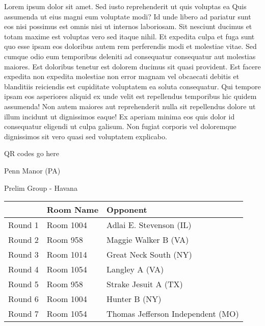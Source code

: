 \documentclass{article}%
\begin{document}
\vspace*{8pt}%
\linebreak%
\newline%
\newline%
Lorem ipsum dolor sit amet. Sed iusto reprehenderit ut quis voluptas ea Quis assumenda ut eius magni eum voluptate modi? Id unde libero ad pariatur sunt eos nisi possimus est omnis nisi ut internos laboriosam. Sit nesciunt ducimus et totam maxime est voluptas vero sed itaque nihil. Et expedita culpa et fuga sunt quo esse ipsam eos doloribus autem rem perferendis modi et molestiae vitae.\newline%
\newline%
Sed cumque odio eum temporibus deleniti ad consequatur consequatur aut molestias maiores. Est doloribus tenetur est dolorem ducimus sit quasi provident. Est facere expedita non expedita molestiae non error magnam vel obcaecati debitis et blanditiis reiciendis est cupiditate voluptatem ea soluta consequatur. Qui tempore ipsam eos asperiores aliquid ex unde velit est repellendus temporibus hic quidem assumenda!\newline%
\newline%
Non autem maiores aut reprehenderit nulla sit repellendus dolore ut illum incidunt ut dignissimos eaque! Ex aperiam minima eos quis dolor id consequatur eligendi ut culpa galisum. Non fugiat corporis vel doloremque dignissimos sit vero quasi sed voluptatem explicabo.\newline%
\newline%
%
\vspace*{30pt}%
\begin{center}%
\begin{Huge}%
QR codes go here%
\end{Huge}%
\end{center}%
\newpage%
%
\begin{center}%
\begin{Huge}%
Penn Manor (PA)%
\end{Huge}%
\vspace*{8pt}%
\linebreak%
\begin{Large}%
Prelim Group {-} Havana%
\end{Large}%
\end{center}%
\begin{tabularx}{\textwidth}{|c|Y|Y|}%
\hline%
&Room Name&Opponent\\%
\hline%
Round 1&Room 1004&Adlai E. Stevenson (IL)\\%
Round 2&Room 958&Maggie Walker B (VA)\\%
Round 3&Room 1014&Great Neck South (NY)\\%
Round 4&Room 1054&Langley A (VA)\\%
Round 5&Room 958&Strake Jesuit A (TX)\\%
Round 6&Room 1004&Hunter B (NY)\\%
Round 7&Room 1054&Thomas Jefferson Independent (MO)\\%
\hline%
\end{tabularx}%
\end{document}
